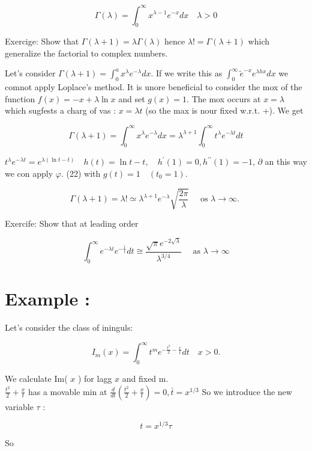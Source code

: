 \documentclass[10pt]{article}
\begin{document}
$$
\Gamma(\lambda)=\int_{0}^{\infty} x^{\lambda-1} e^{-x} d x \quad \lambda>0
$$

Exercige: Show that $\Gamma(\lambda+1)=\lambda \Gamma(\lambda)$ hence $\lambda!=\Gamma(\lambda+1)$ which generalize the factorial to complex numbers.

Let's consider $\Gamma(\lambda+1)=\int_{0}^{a} x^{\lambda} e^{-\lambda} d x$. If we write this as $\int_{0}^{\infty} \tilde{e}^{-x} e^{\lambda h x} d x$ we comnot apply Loplace's method. It is unore beneficial to consider the mox of the function $f(x)=-x+\lambda \ln x$ and set $g(x)=1$. The mox occurs at $x=\lambda$ which sugfests a charg of vas : $x=\lambda t$ (so the max is nour fixed w.r.t. +). We get

$$
\Gamma(\lambda+1)=\int_{0}^{\infty} x^{\lambda} e^{-\lambda} d x=\lambda^{\lambda+1} \int_{0}^{\infty} t^{\lambda} e^{-\lambda t} d t
$$

$t^{\lambda} e^{-\lambda t}=e^{\lambda(\ln t-t)} \quad h(t)=\ln t-t, \quad h^{\prime}(1)=0, h^{\prime \prime}(1)=-1$, $\partial$ an this way we con apply $\varphi$. (22) with $g(t)=1 \quad\left(t_{0}=1\right)$.


\begin{equation*}
\Gamma(\lambda+1)=\lambda!\simeq \lambda^{\lambda+1} e^{-\lambda} \sqrt{\frac{2 \pi}{\lambda}} \quad \text { os } \lambda \rightarrow \infty \text {. } \tag{26}
\end{equation*}


Exercife: Show that at leading order

$$
\int_{0}^{\infty} e^{-\lambda t} e^{-\frac{1}{t}} d t \cong \frac{\sqrt{\pi} e^{-2 \sqrt{\lambda}}}{\lambda^{3 / 4}} \quad \text { as } \lambda \rightarrow \infty
$$

\section*{Example :}
Let's consider the class of ininguls:

$$
I_{m}(x)=\int_{0}^{\infty} t^{m} e^{-\frac{t^{2}}{2}-\frac{x}{t}} d t \quad x>0 .
$$

We calculate Im( $x$ ) for lagg $x$ and fixed m.\\
$\frac{t^{2}}{2}+\frac{x}{t}$ has a movable min at $\frac{d}{d t}\left(\frac{t^{2}}{2}+\frac{x}{t}\right)=0, \bar{t}=x^{1 / 3}$ So we introduce the new variable $\tau$ :

$$
t=x^{1 / 3} \tau
$$

So
\end{document}
